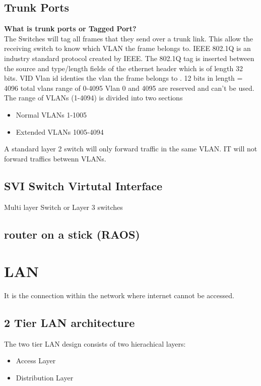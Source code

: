 \documentclass{report}
\begin{document}
	\section{Trunk Ports}
	\textbf{What is trunk ports or Tagged Port?}\\ The Switches will tag all
	frames that they send over a trunk link. This allow the receiving switch to know
	which VLAN the frame belongs to. IEEE 802.1Q is an industry standard protocol created
	by IEEE. The 802.1Q tag is inserted between the source and type/length fields of
	the ethernet header which is of length 32 bits. VID Vlan id identies the vlan
	the frame belongs to . 12 bits in length = 4096 total vlans range of 0-4095
	Vlan 0 and 4095 are reserved and can't be used.\\ The range of VLANs (1-4094)
	is divided into two sections
	\begin{itemize}
		\item Normal VLANs 1-1005

		\item Extended VLANs 1005-4094
	\end{itemize}
	A standard layer 2 switch will only forward traffic in the same VLAN. IT will not
	forward traffics betwenn VLANs.\\
        
        


	\section{SVI Switch Virtutal Interface}
	Multi layer Switch or Layer 3 switches

	\section{router on a stick (RAOS)}

	\chapter{LAN}
	It is the connection within the network where internet cannot be accessed.

	\section{2 Tier LAN architecture}
	The two tier LAN design consists of two hierachical layers:
	\begin{itemize}
		\item Access Layer

		\item Distribution Layer
	\end{itemize}
\end{document}
